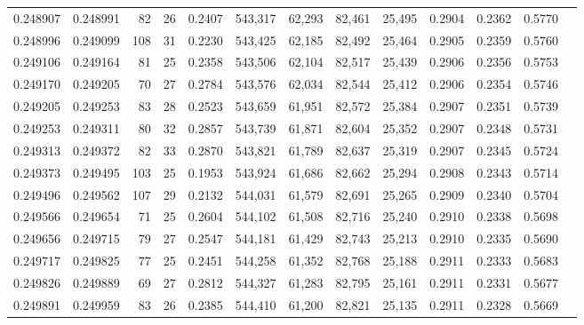 \begin{tabular}{rrrrrrrrrrrrr}
0.248907 & 0.248991 &  82 &  26 &                                     0.2407 & 543,317 &  62,293 &  82,461 &  25,495 & 0.2904 & 0.2362 & 0.5770 \\
0.248996 & 0.249099 & 108 &  31 &                                     0.2230 & 543,425 &  62,185 &  82,492 &  25,464 & 0.2905 & 0.2359 & 0.5760 \\
0.249106 & 0.249164 &  81 &  25 &                                     0.2358 & 543,506 &  62,104 &  82,517 &  25,439 & 0.2906 & 0.2356 & 0.5753 \\
0.249170 & 0.249205 &  70 &  27 &                                     0.2784 & 543,576 &  62,034 &  82,544 &  25,412 & 0.2906 & 0.2354 & 0.5746 \\
0.249205 & 0.249253 &  83 &  28 &                                     0.2523 & 543,659 &  61,951 &  82,572 &  25,384 & 0.2907 & 0.2351 & 0.5739 \\
0.249253 & 0.249311 &  80 &  32 &                                     0.2857 & 543,739 &  61,871 &  82,604 &  25,352 & 0.2907 & 0.2348 & 0.5731 \\
0.249313 & 0.249372 &  82 &  33 &                                     0.2870 & 543,821 &  61,789 &  82,637 &  25,319 & 0.2907 & 0.2345 & 0.5724 \\
0.249373 & 0.249495 & 103 &  25 &                                     0.1953 & 543,924 &  61,686 &  82,662 &  25,294 & 0.2908 & 0.2343 & 0.5714 \\
0.249496 & 0.249562 & 107 &  29 &                                     0.2132 & 544,031 &  61,579 &  82,691 &  25,265 & 0.2909 & 0.2340 & 0.5704 \\
0.249566 & 0.249654 &  71 &  25 &                                     0.2604 & 544,102 &  61,508 &  82,716 &  25,240 & 0.2910 & 0.2338 & 0.5698 \\
0.249656 & 0.249715 &  79 &  27 &                                     0.2547 & 544,181 &  61,429 &  82,743 &  25,213 & 0.2910 & 0.2335 & 0.5690 \\
0.249717 & 0.249825 &  77 &  25 &                                     0.2451 & 544,258 &  61,352 &  82,768 &  25,188 & 0.2911 & 0.2333 & 0.5683 \\
0.249826 & 0.249889 &  69 &  27 &                                     0.2812 & 544,327 &  61,283 &  82,795 &  25,161 & 0.2911 & 0.2331 & 0.5677 \\
0.249891 & 0.249959 &  83 &  26 &                                     0.2385 & 544,410 &  61,200 &  82,821 &  25,135 & 0.2911 & 0.2328 & 0.5669 \\

\end{tabular}
